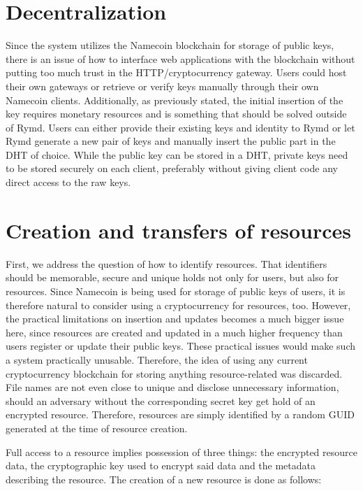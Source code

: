 \section{Decentralization}
Since the system utilizes the Namecoin blockchain for storage of public keys, there is an issue of how to interface web applications with the blockchain without putting too much trust in the HTTP/cryptocurrency gateway. Users could host their own gateways or retrieve or verify keys manually through their own Namecoin clients. Additionally, as previously stated, the initial insertion of the key requires monetary resources and is something that should be solved outside of Rymd. Users can either provide their existing keys and identity to Rymd or let Rymd generate a new pair of keys and manually insert the public part in the DHT of choice. While the public key can be stored in a DHT, private keys need to be stored securely on each client, preferably without giving client code any direct access to the raw keys.

\section{Creation and transfers of resources}
\label{sec:creationofresources}
First, we address the question of how to identify resources. That identifiers should be memorable, secure and unique holds not only for users, but also for resources. Since Namecoin is being used for storage of public keys of users, it is therefore natural to consider using a cryptocurrency for resources, too. However, the practical limitations on insertion and updates becomes a much bigger issue here, since resources are created and updated in a much higher frequency than users register or update their public keys. These practical issues would make such a system practically unusable. Therefore, the idea of using any current cryptocurrency blockchain for storing anything resource-related was discarded. File names are not even close to unique and disclose unnecessary information, should an adversary without the corresponding secret key get hold of an encrypted resource. Therefore, resources are simply identified by a random GUID generated at the time of resource creation.

Full access to a resource implies possession of three things: the encrypted resource data, the cryptographic key used to encrypt said data and the metadata describing the resource. The creation of a new resource is done as follows:

